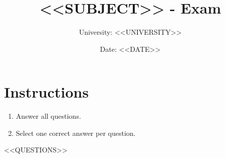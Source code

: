\documentclass[12pt]{article}
\title{<<SUBJECT>> - Exam}
\author{University: <<UNIVERSITY>>}
\date{Date: <<DATE>>}
\begin{document}
\maketitle

\section*{Instructions}
\begin{enumerate}
    \item Answer all questions.
    \item Select one correct answer per question.
\end{enumerate}

<<QUESTIONS>>
\end{document}

